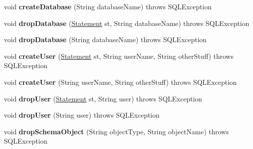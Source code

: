 \begin{DoxyCompactItemize}
void {\bfseries create\+Database} (String database\+Name)  throws S\+Q\+L\+Exception 
\item 
\mbox{\label{classtestsuite_1_1_base_test_case_a4f50d8b7e052b9a454a2edc5d4c73cfd}} 
void {\bfseries drop\+Database} (\mbox{\hyperlink{interfacecom_1_1mysql_1_1jdbc_1_1_statement}{Statement}} st, String database\+Name)  throws S\+Q\+L\+Exception 
\item 
\mbox{\label{classtestsuite_1_1_base_test_case_aaef6c7d74693cac4684e1fc34a35524b}} 
void {\bfseries drop\+Database} (String database\+Name)  throws S\+Q\+L\+Exception 
\item 
\mbox{\label{classtestsuite_1_1_base_test_case_a572945638013e76cba6fa17a9e7f4ee5}} 
void {\bfseries create\+User} (\mbox{\hyperlink{interfacecom_1_1mysql_1_1jdbc_1_1_statement}{Statement}} st, String user\+Name, String other\+Stuff)  throws S\+Q\+L\+Exception 
\item 
\mbox{\label{classtestsuite_1_1_base_test_case_afd3a6d04fc70a7d2fbff92ed1e8cb01d}} 
void {\bfseries create\+User} (String user\+Name, String other\+Stuff)  throws S\+Q\+L\+Exception 
\item 
\mbox{\label{classtestsuite_1_1_base_test_case_a977fa9542cf99aaec9354c7fa6b2a677}} 
void {\bfseries drop\+User} (\mbox{\hyperlink{interfacecom_1_1mysql_1_1jdbc_1_1_statement}{Statement}} st, String user)  throws S\+Q\+L\+Exception 
\item 
\mbox{\label{classtestsuite_1_1_base_test_case_a9a9d1bad807c93b02d0cdfda3b217195}} 
void {\bfseries drop\+User} (String user)  throws S\+Q\+L\+Exception 
\item 
\mbox{\label{classtestsuite_1_1_base_test_case_a8778ffee4f5311ddcf9f34a431e65fd5}} 
void {\bfseries drop\+Schema\+Object} (String object\+Type, String object\+Name)  throws S\+Q\+L\+Exception 
\item 
\mbox{\label{classtestsuite_1_1_base_test_case_a7c25fb4e0676e75d993648ef990ee28f}} 

\end{DoxyCompactItemize}
